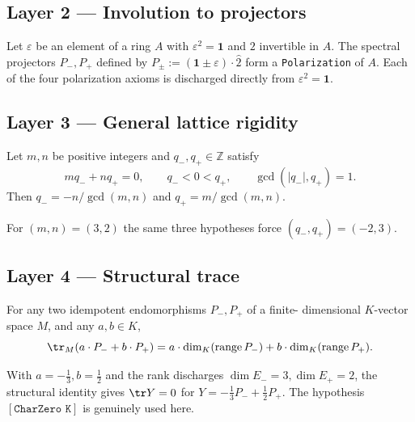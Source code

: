 \subsection*{Layer 2 --- Involution to projectors}

\begin{theorem}
Let $\varepsilon$ be an element of a ring $A$ with $\varepsilon^2 = \mathbf 1$ and
$2$ invertible in $A$. The spectral projectors $P_-, P_+$ defined
by $P_\pm := (\mathbf 1\pm\varepsilon)\cdot\widehat 2$ form a
\texttt{Polarization} of $A$. Each of the four polarization
axioms is discharged directly from $\varepsilon^2 = \mathbf 1$.
\end{theorem}

\subsection*{Layer 3 --- General lattice rigidity}

\begin{theorem}
Let $m, n$ be positive integers and $q_-, q_+ \in \mathbb Z$ satisfy
\[
m q_- + n q_+ = 0,\qquad q_- < 0 < q_+,\qquad
\gcd(|q_-|, q_+) = 1.
\]
Then
$q_- = -n/\gcd(m,n)$ and $q_+ = m/\gcd(m,n)$.
\end{theorem}

\begin{corollary}
For $(m, n) = (3, 2)$ the same three hypotheses force
$(q_-, q_+) = (-2, 3)$.
\end{corollary}

\subsection*{Layer 4 --- Structural trace}

\begin{theorem}
For any two idempotent endomorphisms $P_-, P_+$ of a finite-
dimensional $K$-vector space $M$, and any $a, b \in K$,
\[
\tr_M(a\cdot P_- + b\cdot P_+)
= a \cdot \dim_K(\operatorname{range} P_-)
+ b \cdot \dim_K(\operatorname{range} P_+).
\]
\end{theorem}

\begin{corollary}
With $a=-\tfrac13, b=\tfrac12$ and the rank discharges
$\dim E_- = 3, \dim E_+ = 2$, the structural identity gives
$\tr Y = 0$ for $Y = -\tfrac13 P_- + \tfrac12 P_+$.
The hypothesis $[\texttt{CharZero K}]$ is genuinely used here.
\end{corollary}

